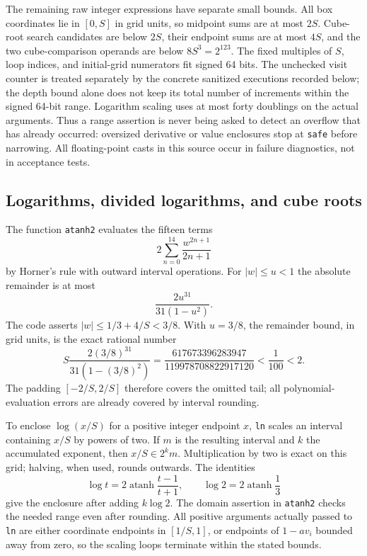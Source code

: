 The remaining raw integer expressions have separate small bounds.
All box coordinates lie in $[0,S]$ in grid units, so midpoint sums
are at most $2S$.  Cube-root search candidates are below $2S$,
their endpoint sums are at most $4S$, and the two cube-comparison
operands are below $8S^3=2^{123}$.  The fixed multiples of $S$, loop
indices, and initial-grid numerators fit signed 64 bits.
The unchecked visit counter is treated separately by the concrete
sanitized executions recorded below; the depth bound alone does not
keep its total number of increments within the signed 64-bit range.
Logarithm scaling uses at most forty doublings on the actual
arguments.  Thus a range assertion is never being asked to detect an
overflow that has already occurred: oversized derivative or value
enclosures stop at \texttt{safe} before narrowing.  All floating-point
casts in this source occur in failure diagnostics, not in acceptance
tests.

\subsection{Logarithms, divided logarithms, and cube roots}
\label{int:logs}

The function \texttt{atanh2} evaluates the fifteen terms
\[
 2\sum_{n=0}^{14}\frac{w^{2n+1}}{2n+1}
\]
by Horner's rule with outward interval operations.  For $|w|\le u<1$
the absolute remainder is at most
\[
 \frac{2u^{31}}{31(1-u^2)}.
\]
The code asserts $|w|\le1/3+4/S<3/8$.  With $u=3/8$, the remainder
bound, in grid units, is the exact rational number
\begin{equation}
 S\frac{2(3/8)^{31}}{31(1-(3/8)^2)}
 =\frac{617673396283947}{119978708822917120}
 <\frac1{100}<2.
 \label{int:atanh-tail}
\end{equation}
The padding $[-2/S,2/S]$ therefore covers the omitted tail; all
polynomial-evaluation errors are already covered by interval rounding.

To enclose $\log(x/S)$ for a positive integer endpoint $x$,
\texttt{ln} scales an interval containing $x/S$ by powers of two.
If $m$ is the resulting interval and $k$ the accumulated exponent,
then $x/S\in2^km$.  Multiplication by two is exact on this grid;
halving, when used, rounds outwards.  The identities
\[
 \log t=2\operatorname{atanh}\frac{t-1}{t+1},\qquad
 \log2=2\operatorname{atanh}\frac13
\]
give the enclosure after adding $k\log2$.  The domain assertion in
\texttt{atanh2} checks the needed range even after rounding.  All
positive arguments actually passed to \texttt{ln} are either coordinate
endpoints in $[1/S,1]$, or endpoints of $1-av_i$ bounded away from
zero, so the scaling loops terminate within the stated bounds.

